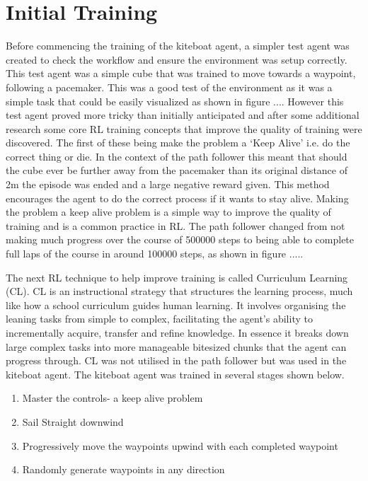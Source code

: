 \section{Initial Training}
Before commencing the training of the kiteboat agent, a simpler test agent was created to check the workflow and ensure the environment was setup correctly. This test agent was a simple cube that was trained to move towards a waypoint, following a pacemaker. This was a good test of the environment as it was a simple task that could be easily visualized as shown in figure .... However this test agent proved more tricky than initially anticipated and after some additional research some core RL training concepts that improve the quality of training were discovered. The first of these being make the problem a `Keep Alive' i.e. do the correct thing or die. In the context of the path follower this meant that should the cube ever be further away from the pacemaker than its original distance of 2m the episode was ended and a large negative reward given. This method encourages the agent to do the correct process if it wants to stay alive. Making the problem a keep alive problem is a simple way to improve the quality of training and is a common practice in RL. The path follower changed from not making much progress over the course of 500000 steps to being able to complete full laps of the course in around 100000 steps, as shown in figure  .....

The next RL technique to help improve training is called Curriculum Learning (CL). CL is an instructional strategy that structures the learning process, much like how a school curriculum guides human learning. It involves organising the leaning tasks from simple to complex, facilitating the agent's ability to incrementally acquire, transfer and refine knowledge. In essence it breaks down large complex tasks into more manageable bitesized chunks that the agent can progress through. CL was not utilised in the path follower but was used in the kiteboat agent. The kiteboat agent was trained in several stages shown below.
\begin{enumerate}
    \item Master the controls- a keep alive problem
    \item Sail Straight downwind
    \item Progressively move the waypoints upwind with each completed waypoint
    \item Randomly generate waypoints in any direction 
\end{enumerate}


